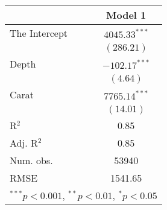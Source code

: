 \begin{tabular}{l c }
	\hline
	& Model 1 \\
	\hline
	The Intercept & $4045.33^{***}$ \\
	& $(286.21)$      \\
	Depth         & $-102.17^{***}$ \\
	& $(4.64)$        \\
	Carat         & $7765.14^{***}$ \\
	& $(14.01)$       \\
	\hline
	R$^2$         & 0.85            \\
	Adj. R$^2$    & 0.85            \\
	Num. obs.     & 53940           \\
	RMSE          & 1541.65         \\
	\hline
	\multicolumn{2}{l}{\scriptsize{$^{***}p<0.001$, $^{**}p<0.01$, $^*p<0.05$}}
\end{tabular}